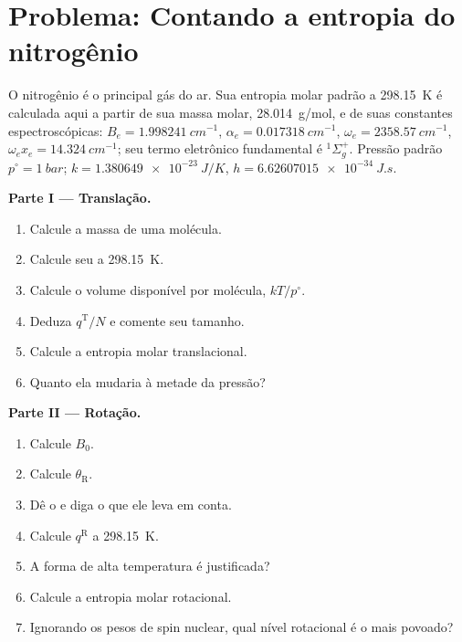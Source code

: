 \section{Problema: Contando a entropia do nitrogênio}

\begin{problem}
\label{pb:b3:partition-functions:1}
O nitrogênio é o principal gás do ar. Sua entropia molar padrão a
\qty{298.15}{K} é calculada aqui a partir de sua massa molar, \qty{28.014}{g/mol}, e de suas
constantes espectroscópicas: $B_e = \qty{1.998241}{cm^{-1}}$, $\alpha_e = \qty{0.017318}{cm^{-1}}$, $\omega_e =
\qty{2358.57}{cm^{-1}}$, $\omega_ex_e = \qty{14.324}{cm^{-1}}$; seu termo eletrônico fundamental é ${}^1\Sigma_g^+$.
Pressão padrão $p^\circ = \qty{1}{bar}$; $k = \qty{1.380649e-23}{J/K}$, $h = \qty{6.62607015e-34}{J.s}$.

\medskip\noindent\textbf{Parte I --- Translação.}
\begin{enumerate}
  \item Calcule a massa de uma molécula.
  \item Calcule seu  a \qty{298.15}{K}.
  \item Calcule o volume disponível por molécula, $kT/p^\circ$.
  \item Deduza $q^{\mathrm T}/N$ e comente seu tamanho.
  \item Calcule a entropia molar translacional.
  \item Quanto ela mudaria à metade da pressão?
\end{enumerate}

\medskip\noindent\textbf{Parte II --- Rotação.}
\begin{enumerate}[resume]
  \item Calcule $B_0$.
  \item Calcule $\theta_{\mathrm R}$.
  \item Dê o  e diga o que ele leva em conta.
  \item Calcule $q^{\mathrm R}$ a \qty{298.15}{K}.
  \item A forma de alta temperatura é justificada?
  \item Calcule a entropia molar rotacional.
  \item Ignorando os pesos de spin nuclear, qual nível rotacional é o mais
        povoado?
\end{enumerate}


\end{problem}

